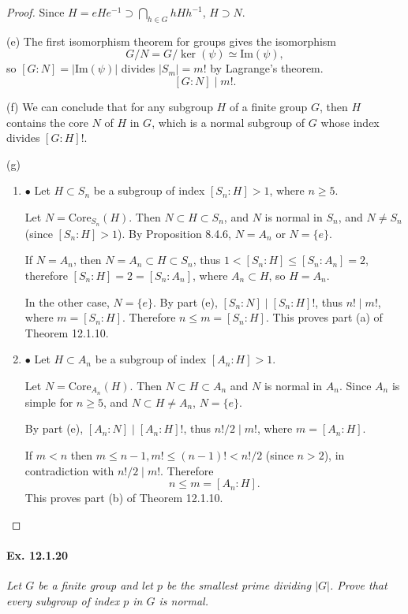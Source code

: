 \documentclass[11pt,a4paper]{article}
\newcommand{\be} {\begin{enumerate}}
\newcommand{\ee} {\end{enumerate}}
\begin{document}
\begin{proof}
Since $H = eHe^{-1} \supset \bigcap_{h\in G} hHh^{-1}$, $H\supset N$.

\item[(e)] The first isomorphism theorem for groups gives the isomorphism $$G/N = G/\ker(\psi) \simeq \mathrm{Im}(\psi),$$ so $[G:N] = |\mathrm{Im}(\psi)|$ divides $|S_m| = m!$ by Lagrange's theorem.
$$[G:N] \mid m!.$$

\item[(f)] We can conclude that for any subgroup $H$ of a finite group $G$, then $H$ contains the core $N$ of $H$ in $G$, which is a normal subgroup of $G$ whose index divides $[G:H]!$.

\item[(g)]
   \be \item[$\bullet$] Let $H \subset S_n$ be a subgroup of index $[S_n:H]>1$, where $n\geq 5$.
   
   Let $N = \mathrm{Core}_{S_n}(H)$. Then $N\subset H \subset S_n$, and $N$ is normal in $S_n$, and $N\ne S_n$ (since $[S_n:H]>1$). By Proposition 8.4.6, $N = A_n$ or $N=\{e\}$.
   
   If $N = A_n$, then $N=A_n \subset H \subset S_n$, thus $1< [S_n:H] \leq [S_n:A_n] = 2$, therefore $[S_n:H] = 2 = [S_n:A_n]$, where $A_n \subset H$, so $H = A_n$.
   
   In the other case, $N = \{e\}$. By part (e), $[S_n : N] \mid [S_n:H]!$, thus $n! \mid m!$, where $m = [S_n:H]$. Therefore $n\leq m =[S_n:H]$. This proves part (a) of Theorem 12.1.10.
   
   \item[$\bullet$] Let $H \subset A_n$ be a subgroup of index $[A_n:H]>1$.
   
   Let $N = \mathrm{Core}_{A_n}(H)$. Then $N \subset H \subset A_n$ and $N$ is normal in $A_n$. Since $A_n$ is simple for $n\geq 5$, and $N \subset H \ne A_n$, $N =\{e\}$.
   
   By part (e), $[A_n:N] \mid [A_n:H] !$, thus $n!/2 \mid m!$, where $m = [A_n:H]$.
   
   If $m<n$ then $m \leq n-1, m! \leq (n-1)! < n!/2$ (since $n>2$), in contradiction with $n!/2 \mid m!$. Therefore 
   $$n \leq m = [A_n:H].$$
   This proves part (b) of Theorem 12.1.10.
   \ee
   \end{proof}
   
  
\paragraph{Ex. 12.1.20}

{\it Let $G$ be a finite group and let $p$ be the smallest prime dividing $|G|$. Prove that every subgroup of index $p$ in $G$ is normal.
}
\end{document}
